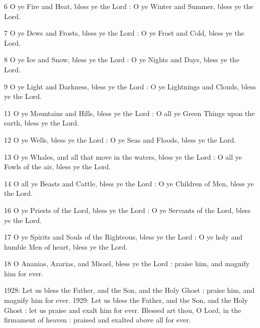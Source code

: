 6 O ye Fire and Heat, bless ye the Lord : O ye Winter and Summer, bless ye the Lord.

7 O ye Dews and Frosts, bless ye the Lord : O ye Frost and Cold, bless ye the Lord.

8 O ye Ice and Snow, bless ye the Lord : O ye Nights and Days, bless ye the Lord.

9 O ye Light and Darkness, bless ye the Lord : O ye Lightnings and Clouds, bless ye the Lord.


11 O ye Mountains and Hills, bless ye the Lord : O all ye Green Things upon the earth, bless ye the Lord.

12 O ye Wells, bless ye the Lord : O ye Seas and Floods, bless ye the Lord.

13 O ye Whales, and all that move in the waters, bless ye the Lord : O all ye Fowls of the air, bless ye the Lord.

14 O all ye Beasts and Cattle, bless ye the Lord : O ye Children of Men, bless ye the Lord.


16 O ye Priests of the Lord, bless ye the Lord : O ye Servants of the Lord, bless ye the Lord.

17 O ye Spirits and Souls of the Righteous, bless ye the Lord : O ye holy and humble Men of heart, bless ye the Lord.

18 O Ananias, Azarias, and Misael, bless ye the Lord : praise him, and magnify him for ever.

1928: Let us bless the Father, and the Son, and the Holy Ghost : praise him, and magnify him for ever.
1929: Let us bless the Father, and the Son, and the Holy Ghost : let us praise and exalt him for ever.
Blessed art thou, O Lord, in the firmament of heaven : praised and exalted above all for ever.


\subsection{}

